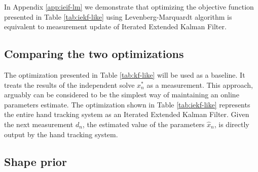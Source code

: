 In Appendix \ref{app:ieif-lm} we demonstrate that optimizing the objective function presented in Table \ref{tab:iekf-like} using Levenberg-Marquardt algorithm is equivalent to measurement update of Iterated Extended Kalman Filter.

\subsection{Comparing the two optimizations}
The optimization presented in Table \ref{tab:kf-like} will be used as a baseline. It treats the results of the independent solve $x_n^*$ as a measurement. This approach, arguably can be considered to be the simplest way of maintaining an online parameters estimate. 
The optimization shown in Table \ref{tab:iekf-like} represents the entire hand tracking system as an Iterated Extended Kalman Filter. Given the next measurement $d_n$, the estimated value of the parameters $\hat{x}_n$,  is directly output by the hand tracking system.

\subsection{Shape prior}
\label{sec:shapeprior}
